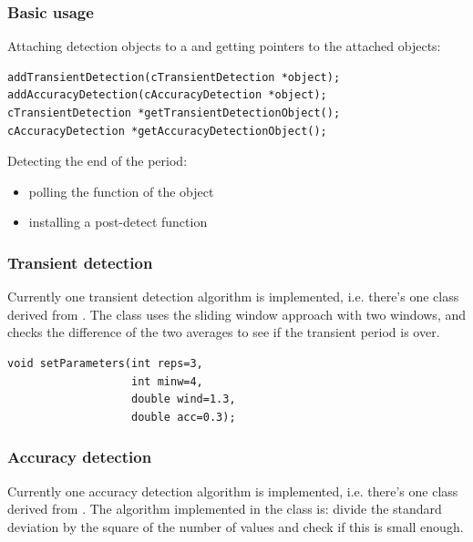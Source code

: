 \subsubsection{Basic usage}

%
%

Attaching detection objects to a  and getting pointers
to the attached objects:

\begin{verbatim}
addTransientDetection(cTransientDetection *object);
addAccuracyDetection(cAccuracyDetection *object);
cTransientDetection *getTransientDetectionObject();
cAccuracyDetection *getAccuracyDetectionObject();
\end{verbatim}


Detecting the end of the period:
\begin{itemize}
\item{polling the  function of the object}
\item{installing a post-detect function}
\end{itemize}


\subsubsection{Transient detection}


Currently one transient detection algorithm
is implemented, i.e.  there's one class derived from
. The  class
uses the sliding window approach with two windows, and checks the
difference of the two averages to see if the transient period is over.

\begin{verbatim}
void setParameters(int reps=3,
                   int minw=4,
                   double wind=1.3,
                   double acc=0.3);
\end{verbatim}

\subsubsection{Accuracy detection}


Currently one accuracy detection algorithm
is implemented, i.e.  there's one class derived from
. The algorithm implemented in the
 class is: divide the standard deviation by the
square of the number of values and check if this is small enough.

